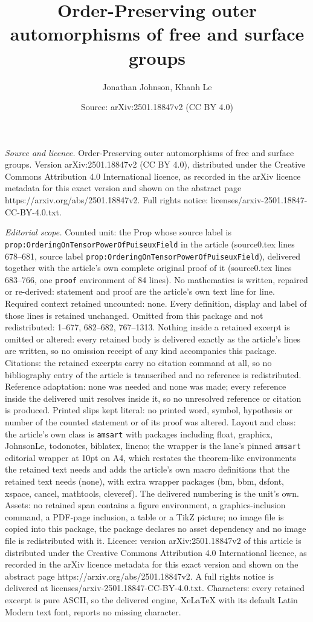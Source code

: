 \documentclass[10pt,a4paper]{amsart}
\title[Order-Preserving outer automorphisms of free and surface gro]{Order-Preserving outer automorphisms of free and surface groups}
\author{Jonathan Johnson, Khanh Le}
\date{Source: arXiv:2501.18847v2 (CC BY 4.0)}
\begin{document}
\maketitle

\noindent\emph{Source and licence.} Order-Preserving outer automorphisms of free and surface groups. Version arXiv:2501.18847v2 (CC BY 4.0), distributed under the Creative Commons Attribution 4.0 International licence, as recorded in the arXiv licence metadata for this exact version and shown on the abstract page https://arxiv.org/abs/2501.18847v2. Full rights notice: licenses/arxiv-2501.18847-CC-BY-4.0.txt.\par\smallskip

\noindent\textit{Editorial scope.} Counted unit: the Prop whose source label is \texttt{prop:OrderingOnTensorPowerOfPuiseuxField} in the article (source0.tex lines 678--681, source label \texttt{prop:OrderingOnTensorPowerOfPuiseuxField}), delivered together with the article's own complete original proof of it (source0.tex lines 683--766, one \texttt{proof} environment of 84 lines). No mathematics is written, repaired or re-derived: statement and proof are the article's own text line for line. Required context retained uncounted: none. Every definition, display and label of those lines is retained unchanged. Omitted from this package and not redistributed: 1--677, 682--682, 767--1313. Nothing inside a retained excerpt is omitted or altered: every retained body is delivered exactly as the article's lines are written, so no omission receipt of any kind accompanies this package. Citations: the retained excerpts carry no citation command at all, so no bibliography entry of the article is transcribed and no reference is redistributed. Reference adaptation: none was needed and none was made; every reference inside the delivered unit resolves inside it, so no unresolved reference or citation is produced. Printed slips kept literal: no printed word, symbol, hypothesis or number of the counted statement or of its proof was altered. Layout and class: the article's own class is \texttt{amsart} with packages including float, graphicx, JohnsonLe, todonotes, biblatex, lineno; the wrapper is the lane's pinned \texttt{amsart} editorial wrapper at 10pt on A4, which restates the theorem-like environments the retained text needs and adds the article's own macro definitions that the retained text needs (none), with extra wrapper packages (bm, bbm, dsfont, xspace, cancel, mathtools, cleveref). The delivered numbering is the unit's own. Assets: no retained span contains a figure environment, a graphics-inclusion command, a PDF-page inclusion, a table or a TikZ picture; no image file is copied into this package, the package declares no asset dependency and no image file is redistributed with it. Licence: version arXiv:2501.18847v2 of this article is distributed under the Creative Commons Attribution 4.0 International licence, as recorded in the arXiv licence metadata for this exact version and shown on the abstract page https://arxiv.org/abs/2501.18847v2. A full rights notice is delivered at licenses/arxiv-2501.18847-CC-BY-4.0.txt. Characters: every retained excerpt is pure ASCII, so the delivered engine, XeLaTeX with its default Latin Modern text font, reports no missing character.
\end{document}
